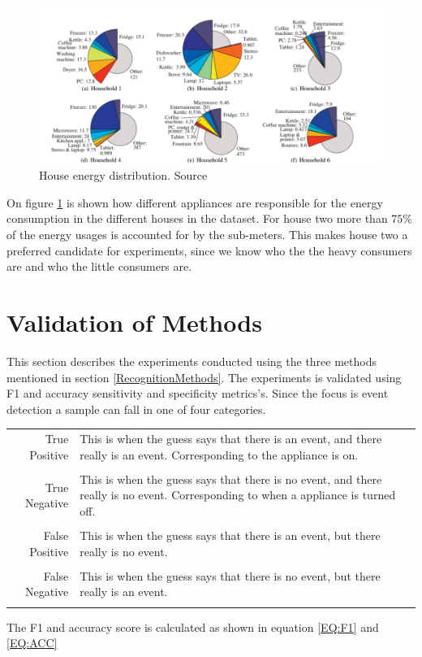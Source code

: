 \begin{figure}[H]
\centering
\includegraphics[width=1\textwidth]{billeder/ECOHouses.png}
\caption{House energy distribution. Source \citep{RefWorks:26}}
\label{fig:EHD}
\end{figure}

On figure \ref{fig:EHD} is shown how different appliances are responsible for the energy consumption in the different houses in the  dataset. For house two more than $75\%$ of the energy usages is accounted for by the sub-meters. This makes house two a preferred candidate for experiments, since we know who the the heavy consumers are and who the little consumers are.  

\section{Validation of Methods} 
This section describes the experiments conducted using the three methods mentioned in section \ref{RecognitionMethods}. The experiments is validated using F1 and accuracy sensitivity and specificity metrics's. Since the focus is event detection a sample can fall in one of four categories. 

\begin{tabularx}{\linewidth}{ r X }
True Positive& This is when the guess says that there is an event, and there really is an event. Corresponding to the appliance is on. \\
\\
True Negative&This is when the guess says that there is no event, and there really is no event. Corresponding to when a appliance is turned off. \\
\\
False Positive& This is when the guess says that there is an event, but there really is no event. \\
\\
False Negative&This is when the guess says that there is no event, but there really is an event. \\\\
\end{tabularx}
The F1 and accuracy score is calculated as shown in equation \ref{EQ:F1} and \ref{EQ:ACC}

